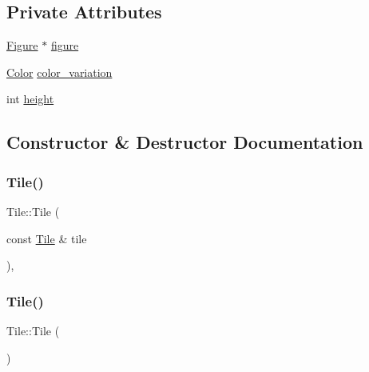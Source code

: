 \subsection*{Private Attributes}
\begin{DoxyCompactItemize}
\item 
\hyperlink{classFigure}{Figure} $\ast$ \hyperlink{classTile_a96976c70d77812bcce266c00ba0513ee}{figure}
\item 
\hyperlink{structColor}{Color} \hyperlink{classTile_abfdce38f0f708b67dd84e0992ebca268}{color\+\_\+variation}
\item 
int \hyperlink{classTile_a1ceee2a6a986af91980d62c039ffe792}{height}
\end{DoxyCompactItemize}


\subsection{Constructor \& Destructor Documentation}
\mbox{\label{classTile_a0118b16957fc9fc912905c3085afe926}} 
\subsubsection{\texorpdfstring{Tile()}{Tile()}\hspace{0.1cm}{\footnotesize\ttfamily [1/2]}}
{\footnotesize\ttfamily Tile\+::\+Tile (\begin{DoxyParamCaption}\item[{const \hyperlink{classTile}{Tile} \&}]{tile }\end{DoxyParamCaption})\hspace{0.3cm}{\ttfamily [private]}, {\ttfamily [delete]}}

\mbox{\label{classTile_aeeb5593bb6b75aae2edfcccbc84ab378}} 
\subsubsection{\texorpdfstring{Tile()}{Tile()}\hspace{0.1cm}{\footnotesize\ttfamily [2/2]}}
{\footnotesize\ttfamily Tile\+::\+Tile (\begin{DoxyParamCaption}{ }\end{DoxyParamCaption})\hspace{0.3cm}{\ttfamily [inline]}}

